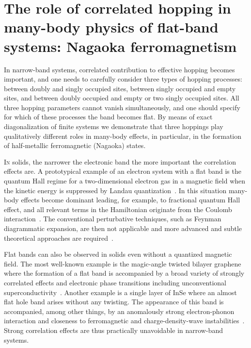 \openleft%
\chapter[The role of correlated hopping in many-body physics of flat-band systems: Nagaoka ferromagnetism][Correlated hoppings in many-body physics of flat-band systems]{The role of correlated hopping in many-body physics of flat-band systems: Nagaoka ferromagnetism}\label{ch:corr-hops}

{\small In narrow-band systems, correlated contribution to effective hopping becomes important, and one needs to carefully consider three types of hopping processes: between doubly and singly occupied sites, between singly occupied and empty sites, and between doubly occupied and empty or two singly occupied sites. All three hopping parameters cannot vanish simultaneously, and one should specify for which of these processes the band becomes flat. By means of exact diagonalization of finite systems we demonstrate that three hoppings play qualitatively different roles in many-body effects, in particular, in the formation of half-metallic ferromagnetic (Nagaoka) states.}

\clearpage


\lettrine[lines=3]{I}{n} solids, the narrower the electronic band the more important the correlation effects are. A prototypical example of an electron system with a flat band is the quantum Hall regime for a two-dimensional electron gas in a magnetic field when the kinetic energy is suppressed by Landau quantization~\cite{quant_hall}. In this situation many-body effects become dominant leading, for example, to fractional quantum Hall effect, and all relevant terms in the Hamiltonian originate from the Coulomb interaction~\cite{murthy}. The conventional perturbative techniques, such as Feynman diagrammatic expansion, are then not applicable and more advanced and subtle theoretical approaches are required~\cite{hansson}. 

Flat bands can also be observed in solids even without a quantized magnetic field. The most well-known example is the magic-angle twisted bilayer graphene~\cite{suarez_morell_flat_2010,bistritzer_moire_2011,li_observation_2010} where the formation of a flat band is accompanied by a broad variety of strongly correlated effects and electronic phase transitions including unconventional superconductivity~\cite{cao_correlated_2018,cao_unconventional_2018,yankowitz_tuning_2019,sharpe_emergent_2019}. Another example is a single layer of InSe where an almost flat hole band arises without any twisting. The appearance of this band is accompanied, among other things, by an anomalously strong electron-phonon interaction and closeness to ferromagnetic and charge-density-wave instabilities~\cite{InSe1,InSe2}. Strong correlation effects are thus practically unavoidable in narrow-band systems.

